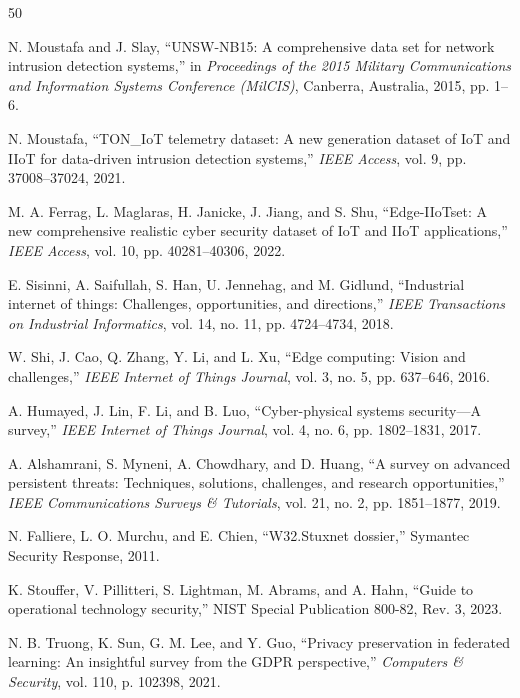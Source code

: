 \documentclass[preprint,12pt]{elsarticle}
\begin{document}
\begin{thebibliography}{50}

N. Moustafa and J. Slay, ``UNSW-NB15: A comprehensive data set for network intrusion detection systems,'' in \emph{Proceedings of the 2015 Military Communications and Information Systems Conference (MilCIS)}, Canberra, Australia, 2015, pp. 1--6.

N. Moustafa, ``TON\_IoT telemetry dataset: A new generation dataset of IoT and IIoT for data-driven intrusion detection systems,'' \emph{IEEE Access}, vol. 9, pp. 37008--37024, 2021.

M. A. Ferrag, L. Maglaras, H. Janicke, J. Jiang, and S. Shu, ``Edge-IIoTset: A new comprehensive realistic cyber security dataset of IoT and IIoT applications,'' \emph{IEEE Access}, vol. 10, pp. 40281--40306, 2022.

E. Sisinni, A. Saifullah, S. Han, U. Jennehag, and M. Gidlund, ``Industrial internet of things: Challenges, opportunities, and directions,'' \emph{IEEE Transactions on Industrial Informatics}, vol. 14, no. 11, pp. 4724--4734, 2018.

W. Shi, J. Cao, Q. Zhang, Y. Li, and L. Xu, ``Edge computing: Vision and challenges,'' \emph{IEEE Internet of Things Journal}, vol. 3, no. 5, pp. 637--646, 2016.

A. Humayed, J. Lin, F. Li, and B. Luo, ``Cyber-physical systems security---A survey,'' \emph{IEEE Internet of Things Journal}, vol. 4, no. 6, pp. 1802--1831, 2017.

A. Alshamrani, S. Myneni, A. Chowdhary, and D. Huang, ``A survey on advanced persistent threats: Techniques, solutions, challenges, and research opportunities,'' \emph{IEEE Communications Surveys \& Tutorials}, vol. 21, no. 2, pp. 1851--1877, 2019.

N. Falliere, L. O. Murchu, and E. Chien, ``W32.Stuxnet dossier,'' Symantec Security Response, 2011.

K. Stouffer, V. Pillitteri, S. Lightman, M. Abrams, and A. Hahn, ``Guide to operational technology security,'' NIST Special Publication 800-82, Rev. 3, 2023.

N. B. Truong, K. Sun, G. M. Lee, and Y. Guo, ``Privacy preservation in federated learning: An insightful survey from the GDPR perspective,'' \emph{Computers \& Security}, vol. 110, p. 102398, 2021.


\end{thebibliography}
\end{document}
